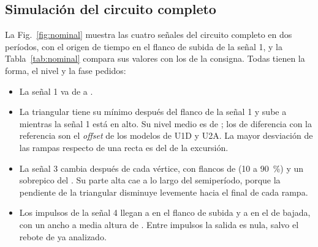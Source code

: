\subsection{Simulación del circuito completo}
\label{sec:completo}
La Fig.~\ref{fig:nominal} muestra las cuatro señales del circuito completo en dos períodos, con el origen de tiempo en el flanco de subida de la señal 1, y la Tabla~\ref{tab:nominal} compara sus valores con los de la consigna. Todas tienen la forma, el nivel y la fase pedidos:
\begin{itemize}[leftmargin=*, nosep]
    \item La señal 1 va de  a .
    \item La triangular tiene su mínimo  después del flanco de la señal 1 y sube a  mientras la señal 1 está en alto. Su nivel medio es de ; los  de diferencia con la referencia son el \emph{offset} de los modelos de U1D y U2A. La mayor desviación de las rampas respecto de una recta es del  de la excursión.
    \item La señal 3 cambia  después de cada vértice, con flancos de  (\SI{10}{} a \SI{90}{\percent}) y un sobrepico del . Su parte alta cae  a lo largo del semiperíodo, porque la pendiente de la triangular disminuye levemente hacia el final de cada rampa.
    \item Los impulsos de la señal 4 llegan a  en el flanco de subida y a  en el de bajada, con un ancho a media altura de . Entre impulsos la salida es nula, salvo el rebote de  ya analizado.
\end{itemize}

